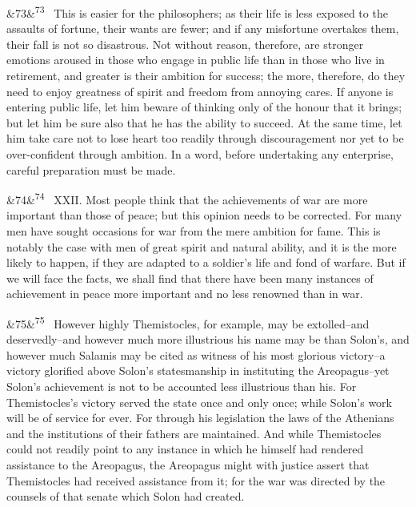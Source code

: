 \documentclass[12pt]{article}
\newcommand{\para}[1][]{\par\noindent\ifx&#1&\else\textsuperscript{\footnotesize #1}~\fi}
\begin{document}
\para[73] This is easier for the philosophers; as their life is less exposed to the assaults of fortune, their wants are fewer; and if any misfortune overtakes them, their fall is not so disastrous. Not without reason, therefore, are stronger emotions aroused in those who engage in public life than in those who live in retirement, and greater is their ambition for success; the more, therefore, do they need to enjoy greatness of spirit and freedom from annoying cares. If anyone is entering public life, let him beware of thinking only of the honour that it brings; but let him be sure also that he has the ability to succeed. At the same time, let him take care not to lose heart too readily through discouragement nor yet to be over-confident through ambition. In a word, before undertaking any enterprise, careful preparation must be made.

\para[74] XXII. Most people think that the achievements of war are more important than those of peace; but this opinion needs to be corrected. For many men have sought occasions for war from the mere ambition for fame. This is notably the case with men of great spirit and natural ability, and it is the more likely to happen, if they are adapted to a soldier's life and fond of warfare. But if we will face the facts, we shall find that there have been many instances of achievement in peace more important and no less renowned than in war.

\para[75] However highly Themistocles, for example, may be extolled--and deservedly--and however much more illustrious his name may be than Solon's, and however much Salamis may be cited as witness of his most glorious victory--a victory glorified above Solon's statesmanship in instituting the Areopagus--yet Solon's achievement is not to be accounted less illustrious than his. For Themistocles's victory served the state once and only once; while Solon's work will be of service for ever. For through his legislation the laws of the Athenians and the institutions of their fathers are maintained. And while Themistocles could not readily point to any instance in which he himself had rendered assistance to the Areopagus, the Areopagus might with justice assert that Themistocles had received assistance from it; for the war was directed by the counsels of that senate which Solon had created.
\end{document}
